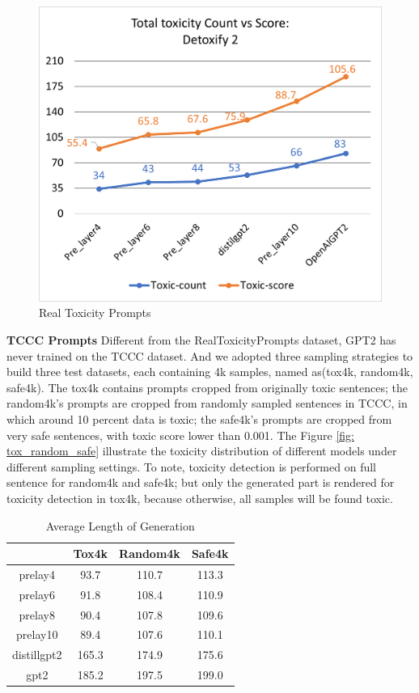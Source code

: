 \begin{figure}[h]
\includegraphics[scale = 0.6]{graphs/detoxify2.png}
\caption{Real Toxicity Prompts}
\centering
\label{fig: real}
\end{figure}

\noindent \textbf{TCCC Prompts} \quad Different from the RealToxicityPrompts dataset, GPT2 has never trained on the TCCC dataset. And we adopted three sampling strategies to build three test datasets, each containing 4k samples, named as(tox4k, random4k, safe4k). The tox4k contains prompts cropped from originally toxic sentences; the random4k's prompts are cropped from randomly sampled sentences in TCCC, in which around 10 percent data is toxic; the safe4k's prompts are cropped from very safe sentences, with toxic score lower than 0.001. The Figure \ref{fig: tox_random_safe} illustrate the toxicity distribution of different models under different sampling settings. To note, toxicity detection is performed on full sentence for random4k and safe4k; but only the generated part is rendered for toxicity detection in tox4k, because otherwise, all samples will be found toxic.\\


\begin{table}[hb]
\centering
\begin{tabular}{|c|c|c|c|}
\hline
            & Tox4k   & Random4k & Safe4k  \\ \hline
prelay4     & 93.7  & 110.7  & 113.3 \\ \hline
prelay6     & 91.8  & 108.4  & 110.9 \\ \hline
prelay8     & 90.4  & 107.8  & 109.6 \\ \hline
prelay10    & 89.4  & 107.6  & 110.1 \\ \hline
distillgpt2 & 165.3 & 174.9  & 175.6 \\ \hline
gpt2        & 185.2 & 197.5  & 199.0 \\ \hline
\end{tabular}
\caption{Average Length of Generation}
\centering
\label{fig: length}
\end{table}



